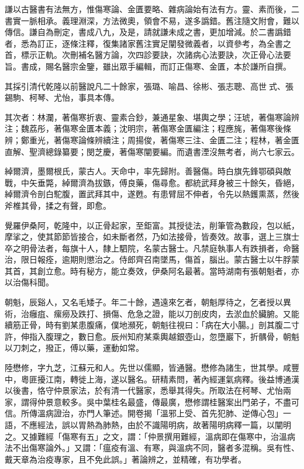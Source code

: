 \begin{pinyinscope}
謙以古醫書有法無方，惟傷寒論、金匱要略、雜病論始有法有方。靈、素而後，二書實一脈相承。義理淵深，方法微奧，領會不易，遂多譌錯。舊注隨文附會，難以傳信。謙自為刪定，書成八九，及是，請就謙未成之書，更加增減。於二書譌錯者，悉為訂正，逐條注釋，復集諸家舊注實足闡發微義者，以資參考，為全書之首，標示正軌。次刪補名醫方論，次四診要訣，次諸病心法要訣，次正骨心法要旨。書成，賜名醫宗金鑒，雖出眾手編輯，而訂正傷寒、金匱，本於謙所自撰。

其採引清代乾隆以前醫說凡二十餘家，張璐、喻昌、徐彬、張志聰、高世式、張錫駒、柯琴、尤怡，事具本傳。

其次者：林瀾，著傷寒折衷、靈素合鈔，兼通星象、堪輿之學；汪琥，著傷寒論辨注；魏荔彤，著傷寒金匱本義；沈明宗，著傷寒金匱編注；程應旄，著傷寒後條辨；鄭重光，著傷寒論條辨續注；周揚俊，著傷寒三注、金匱二注；程林，著金匱直解、聖濟總錄纂要；閔芝慶，著傷寒闡要編。而遺書湮沒無考者，尚六七家云。

綽爾濟，墨爾根氏，蒙古人。天命中，率先歸附。善醫傷。時白旗先鋒鄂碩與敵戰，中矢垂斃，綽爾濟為拔鏃，傅良藥，傷尋愈。都統武拜身被三十餘矢，昏絕，綽爾濟令剖白駝腹，置武拜其中，遂甦。有患臂屈不伸者，令先以熱鑊熏蒸，然後斧椎其骨，揉之有聲，即愈。

覺羅伊桑阿，乾隆中，以正骨起家，至鉅富。其授徒法，削筆管為數段，包以紙，摩挲之，使其節節皆接合，如未斷者然，乃如法接骨，皆奏效。故事，選上三旗士卒之明骨法者，每旗十人，隸上駟院，名蒙古醫士。凡禁庭執事人有跌損者，命醫治，限日報痊，逾期則懲治之。侍郎齊召南墜馬，傷首，腦出。蒙古醫士以牛脬蒙其首，其創立愈。時有秘方，能立奏效，伊桑阿名最著。當時湖南有張朝魁者，亦以治傷科聞。

朝魁，辰谿人，又名毛矮子。年二十餘，遇遠來乞者，朝魁厚待之，乞者授以異術，治癰疽、瘰癆及跌打、損傷、危急之證，能以刀剖皮肉，去淤血於臟腑。又能續筋正骨，時有劉某患腹痛，僕地瀕死，朝魁往視曰：「病在大小腸。」剖其腹二寸許，伸指入腹理之，數日愈。辰州知府某乘輿越銀壺山，忽墮巖下，折髃骨，朝魁以刀刺之，撥正，傅以藥，運動如常。

陸懋修，字九芝，江蘇元和人。先世以儒顯，皆通醫。懋修為諸生，世其學。咸豐中，粵匪擾江南，轉徙上海，遂以醫名。研精素問，著內經運氣病釋。後益博通漢以後書，恪守仲景家法，於有清一代醫家，悉舉其得失。所取法在柯琴、尤怡兩家，謂得仲景意較多。吳中葉桂名最盛，傳最廣，懋修謂桂醫案出門弟子，不盡可信。所傳溫病證治，亦門人筆述。開卷揭「溫邪上受、首先犯肺、逆傳心包」一語，不應經法，誤以胃熱為肺熱，由於不識陽明病，故著陽明病釋一篇，以闡明之。又據難經「傷寒有五」之文，謂：「仲景撰用難經，溫病即在傷寒中，治溫病法不出傷寒論外。」又謂：「瘟疫有溫、有寒，與溫病不同，醫者多混稱。吳有性、戴天章為治疫專家，且不免此誤。」著論辨之，並精確，有功學者。


\end{pinyinscope}
